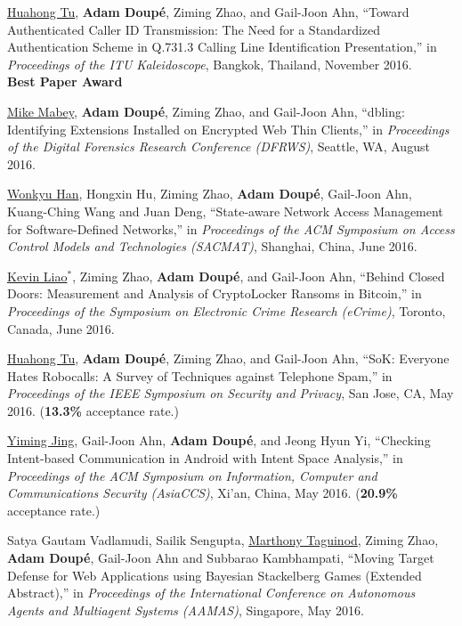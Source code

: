 \documentclass[11pt,letterpaper,sans]{moderncv}
\begin{document}
\begin{etaremune}
\item \underline{Huahong Tu}, \textbf{Adam Doup\'e}, Ziming Zhao, and
  Gail-Joon Ahn, ``Toward Authenticated Caller ID Transmission: The
  Need for a Standardized Authentication Scheme in Q.731.3 Calling
  Line Identification Presentation,'' in \emph{Proceedings of the ITU
    Kaleidoscope}, Bangkok, Thailand, November 2016. \\
  \textbf{Best Paper Award}

\item \underline{Mike Mabey}, \textbf{Adam Doup\'e}, Ziming Zhao, and
  Gail-Joon Ahn, ``dbling: Identifying Extensions Installed on
  Encrypted Web Thin Clients,'' in \emph{Proceedings of the Digital
    Forensics Research Conference (DFRWS)}, Seattle, WA, August 2016.

\item \underline{Wonkyu Han}, Hongxin Hu, Ziming Zhao, \textbf{Adam
  Doup\'e}, Gail-Joon Ahn, Kuang-Ching Wang and Juan Deng,
  ``State-aware Network Access Management for Software-Defined
  Networks,'' in \emph{Proceedings of the ACM Symposium on Access
    Control Models and Technologies (SACMAT)}, Shanghai, China, June
  2016.

\item \underline{Kevin Liao}$^*$, Ziming Zhao, \textbf{Adam Doup\'e},
  and Gail-Joon Ahn, ``Behind Closed Doors: Measurement and Analysis
  of CryptoLocker Ransoms in Bitcoin,'' in \emph{Proceedings of the
    Symposium on Electronic Crime Research (eCrime)}, Toronto, Canada,
  June 2016.

\item \underline{Huahong Tu}, \textbf{Adam Doup\'e}, Ziming Zhao, and
  Gail-Joon Ahn, ``SoK: Everyone Hates Robocalls: A Survey of
  Techniques against Telephone Spam,'' in \emph{Proceedings of the
    IEEE Symposium on Security and Privacy}, San Jose, CA, May 2016.
  (\textbf{13.3\%} acceptance rate.)

\item \underline{Yiming Jing}, Gail-Joon Ahn, \textbf{Adam Doup\'e},
  and Jeong Hyun Yi, ``Checking Intent-based Communication in Android
  with Intent Space Analysis,'' in \emph{Proceedings of the ACM
    Symposium on Information, Computer and Communications Security
  (AsiaCCS)}, Xi’an, China, May 2016. (\textbf{20.9\%} acceptance
  rate.)

\item Satya Gautam Vadlamudi, Sailik Sengupta, \underline{Marthony
  Taguinod}, Ziming Zhao, \textbf{Adam Doup\'e}, Gail-Joon Ahn and
  Subbarao Kambhampati, ``Moving Target Defense for Web Applications
  using Bayesian Stackelberg Games (Extended Abstract),'' in
  \emph{Proceedings of the International Conference on Autonomous
    Agents and Multiagent Systems (AAMAS)}, Singapore, May 2016.


\end{etaremune}
\end{document}

